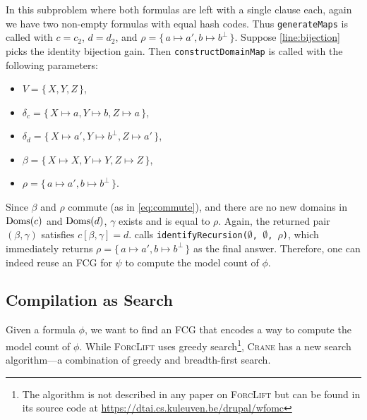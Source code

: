 \begin{example}
  In this subproblem where both formulas are left with a single clause each,
  again we have two non-empty formulas with equal hash codes. Thus
  \texttt{generateMaps} is called with $c = c_2$, $d = d_2$, and
  $\rho = \{\, a \mapsto a', b \mapsto b^\bot \,\}$. Suppose
  \cref{line:bijection} picks the identity bijection gain. Then
  \texttt{constructDomainMap} is called with the following parameters:
  \begin{itemize}
    \item $V = \{\, X, Y, Z \,\}$,
    \item $\delta_c = \{\, X \mapsto a, Y \mapsto b, Z \mapsto a \,\}$,
    \item $\delta_d = \{\, X \mapsto a', Y \mapsto b^\bot, Z \mapsto a' \,\}$,
    \item $\beta = \{\, X \mapsto X, Y \mapsto Y, Z \mapsto Z \,\}$,
    \item $\rho = \{\, a \mapsto a', b \mapsto b^\bot \,\}$.
  \end{itemize}
  Since $\beta$ and $\rho$ commute (as in \cref{eq:commute}), and there are no
  new domains in $\operatorname{Doms}(c)$ and $\operatorname{Doms}(d)$, $\gamma$ exists and is equal to
  $\rho$. Again, the returned pair $(\beta, \gamma)$ satisfies
  $c[\beta, \gamma] = d$.  calls
  \texttt{identifyRecursion($\emptyset$, $\emptyset$, $\rho$)}, which
  immediately returns $\rho = \{\, a \mapsto a', b \mapsto b^\bot \,\}$ as the
  final answer. Therefore, one can indeed reuse an FCG for $\psi$ to compute the
  model count of $\phi$.
\end{example}

\subsection{Compilation as Search}

Given a formula $\phi$, we want to find an FCG that encodes a way to compute the
model count of $\phi$. While \textsc{ForcLift}
\citep{DBLP:conf/ijcai/BroeckTMDR11} uses greedy search\footnote{The algorithm
  is not described in any paper on \textsc{ForcLift} but can be found in its
  source code at \url{https://dtai.cs.kuleuven.be/drupal/wfomc}}, \textsc{Crane}
has a new search algorithm---a combination of greedy and breadth-first search.

